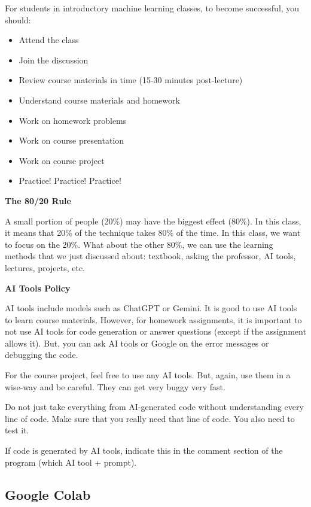 {For students in introductory machine learning classes, to become successful, you should:
\begin{itemize}
    \item Attend the class
    \item Join the discussion
    \item Review course materials in time (15-30 minutes post-lecture)
    \item Understand course materials and homework
    \item Work on homework problems
    \item Work on course presentation
    \item Work on course project
    \item Practice! Practice! Practice!
\end{itemize}

\vspace{11pt}
\textbf{The 80/20 Rule}
\vspace{11pt}

A small portion of people (20\%) may have the biggest effect (80\%). In this class, it means that 20\% of the technique takes 80\% of the time. In this class, we want to focus on the 20\%. What about the other 80\%, we can use the learning methods that we just discussed about: textbook, asking the professor, AI tools, lectures, projects, etc.

\vspace{11pt}
\textbf{AI Tools Policy}
\vspace{11pt}

AI tools include models such as ChatGPT or Gemini. It is good to use AI tools to learn course materials. However, for homework assignments, it is important to not use AI tools for code generation or answer questions (except if the assignment allows it). But, you can ask AI tools or Google on the error messages or debugging the code.

For the course project, feel free to use any AI tools. But, again, use them in a wise-way and be careful. They can get very buggy very fast.

Do not just take everything from AI-generated code without understanding every line of code. Make sure that you really need that line of code. You also need to test it.

If code is generated by AI tools, indicate this in the comment section of the program (which AI tool + prompt).

\vspace{11pt}
\subsection{Google Colab}
\vspace{11pt}

}
